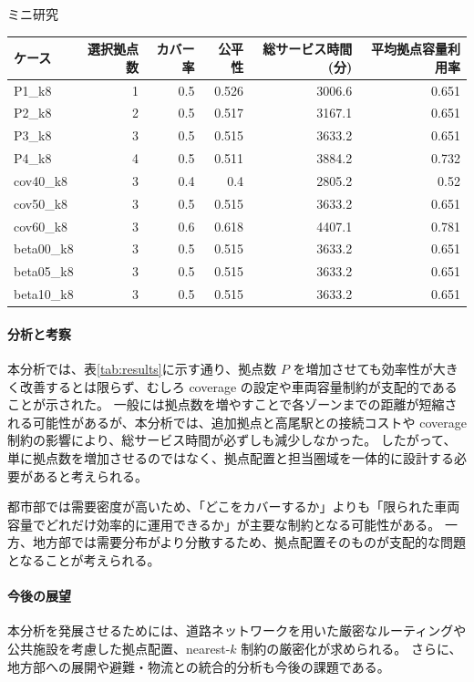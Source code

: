 \begin{column}{ミニ研究}
\begin{center}
\begin{tabular}{lrrrrr}
\toprule
ケース & 選択拠点数 & カバー率 & 公平性 & 総サービス時間(分) & 平均拠点容量利用率 \\ 
\midrule
P1\_k8 & 1 & 0.5 & 0.526 & 3006.6 & 0.651 \\ 
P2\_k8 & 2 & 0.5 & 0.517 & 3167.1 & 0.651 \\ 
P3\_k8 & 3 & 0.5 & 0.515 & 3633.2 & 0.651 \\ 
P4\_k8 & 4 & 0.5 & 0.511 & 3884.2 & 0.732 \\ 
cov40\_k8 & 3 & 0.4 & 0.4 & 2805.2 & 0.52 \\ 
cov50\_k8 & 3 & 0.5 & 0.515 & 3633.2 & 0.651 \\ 
cov60\_k8 & 3 & 0.6 & 0.618 & 4407.1 & 0.781 \\ 
beta00\_k8 & 3 & 0.5 & 0.515 & 3633.2 & 0.651 \\ 
beta05\_k8 & 3 & 0.5 & 0.515 & 3633.2 & 0.651 \\ 
beta10\_k8 & 3 & 0.5 & 0.515 & 3633.2 & 0.651 \\ 
\bottomrule
\end{tabular}
\label{tab:results}
\end{center}

\paragraph{分析と考察}
本分析では、表\ref{tab:results}に示す通り、拠点数 $P$ を増加させても効率性が大きく改善するとは限らず、むしろ coverage の設定や車両容量制約が支配的であることが示された。
一般には拠点数を増やすことで各ゾーンまでの距離が短縮される可能性があるが、本分析では、追加拠点と高尾駅との接続コストや coverage 制約の影響により、総サービス時間が必ずしも減少しなかった。
したがって、単に拠点数を増加させるのではなく、拠点配置と担当圏域を一体的に設計する必要があると考えられる。

都市部では需要密度が高いため、「どこをカバーするか」よりも「限られた車両容量でどれだけ効率的に運用できるか」が主要な制約となる可能性がある。
一方、地方部では需要分布がより分散するため、拠点配置そのものが支配的な問題となることが考えられる。

\paragraph{今後の展望}
本分析を発展させるためには、道路ネットワークを用いた厳密なルーティングや公共施設を考慮した拠点配置、nearest-$k$ 制約の厳密化が求められる。
さらに、地方部への展開や避難・物流との統合的分析も今後の課題である。
\end{column}
\clearpage
